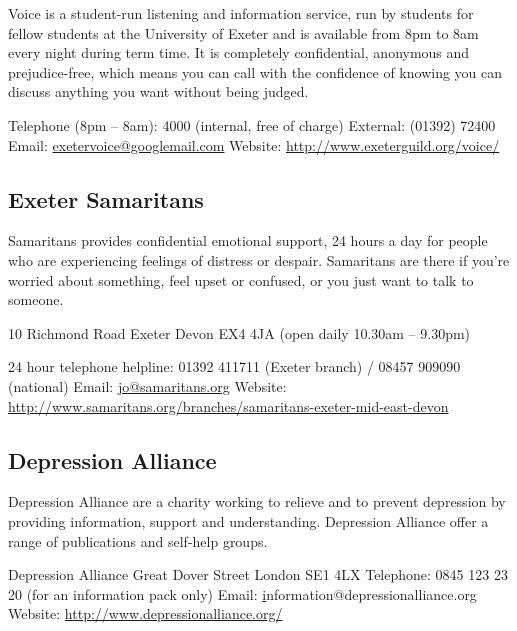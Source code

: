 Voice is a student-run listening and information service, run by students
for fellow students at the University of Exeter and is available from
8pm to 8am every night during term time. It is completely confidential,
anonymous and prejudice-free, which means you can call with the confidence
of knowing you can discuss anything you want without being judged.

Telephone (8pm -- 8am): 4000 (internal, free of charge)\newline
External: (01392) 72400\newline
Email: \href{mailto:exetervoice@googlemail.com}{exetervoice@googlemail.com}\newline
Website: \url{http://www.exeterguild.org/voice/}

\subsection{Exeter Samaritans}

Samaritans provides confidential emotional support, 24 hours a day for
people who are experiencing feelings of distress or despair. Samaritans
are there if you're worried about something, feel upset or confused,
or you just want to talk to someone.

10 Richmond Road\newline
Exeter\newline
Devon\newline
EX4 4JA (open daily 10.30am -- 9.30pm)

24 hour telephone helpline: 01392 411711 (Exeter branch) / 08457 909090 (national)\newline
Email: \href{mailto:jo@samaritans.org}{jo@samaritans.org}\newline
Website: \url{http://www.samaritans.org/branches/samaritans-exeter-mid-east-devon}

\subsection{Depression Alliance}

Depression Alliance are a charity working to relieve and to prevent
depression by providing information, support and understanding. Depression
Alliance offer a range of publications and self-help groups.

Depression Alliance Great Dover Street\newline
London\newline
SE1 4LX\newline
Telephone: 0845 123 23 20 (for an information pack only)\newline
Email: \href{mailto:information@depressionalliance.org}information@depressionalliance.org\newline
Website: \url{http://www.depressionalliance.org/}
